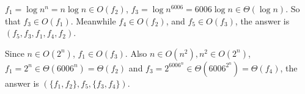 \documentclass[12pt,twoside]{article}
\begin{document}


\begin{problems}

\problem  %

\begin{problemparts}
  \problempart %
  $f_1 = \log{n^n} = n\log{n} \in O(f_2)$,
  $f_3 = \log{n^{6006}} = 6006\log{n} \in \Theta(\log{n})$. So that
  $f_3 \in O(f_1)$. Meanwhile $f_4 \in O(f_2)$, and $f_5 \in O(f_3)$, the
  answer is $(f_5, f_3, f_1, f_4, f_2)$.

  \problempart %
  Since $n \in O(2^n)$, $f_1 \in O(f_3)$. Also
  $n \in O(n^2), n^2 \in O(2^n)$,
  $f_1 = 2^n \in \Theta(6006^n) = \Theta(f_2)$ and
  $f_3 = 2^{6006^n} \in \Theta(6006^{2^n}) = \Theta(f_4)$, the answer is
  $(\{f_1, f_2\}, f_5, \{f_3, f_4\})$.
  

\end{problemparts}
\end{problems}
\end{document}
